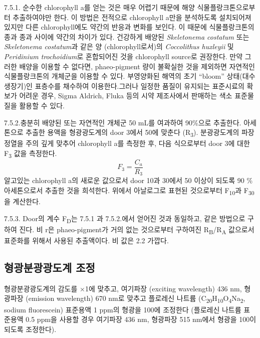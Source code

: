 \documentclass[
]{book}
\begin{document}
7.5.1. 순수한 chlorophyll a를 얻는 것은 매우 어렵기 때문에 해양 식물플랑크톤으로부터 추출하여야만 한다. 이 방법은 전적으로 chlorophyll a만을 분석하도록 설치되어져 있지만 다른 chlorophyll에도 약간의 반응과 변화를 보인다. 이 때문에 식물플랑크톤의 종과 종과 사이에 약간의 차이가 있다. 건강하게 배양된 \emph{Skeletonema costatum} 또는 \emph{Skeletonema costatum}과 같은 양 (chlorophyll로서)의 \emph{Coccolithus huxleyii} 및 \emph{Peridinium trochoidium}로 혼합되어진 것을 chlorophyll source로 권장한다. 만약 그러한 배양을 이용할 수 없다면, phaeo-pigment 량이 불확실한 것을 제외하면 자연적인 식물플랑크톤의 개체군을 이용할 수 있다. 부영양화된 해역의 초기 ``bloom'' 상태(대수 생장기)인 표층수를 채수하여 이용한다.그러나 일정한 품질이 유지되는 표준시료의 확보가 어려운 경우, Sigma Aldrich, Fluka 등의 시약 제조사에서 판매하는 색소 표준물질을 활용할 수 있다.

7.5.2.충분히 배양된 또는 자연적인 개체군 50 mL를 여과하여 90\%으로 추출한다. 아세톤으로 추출한 용액을 형광광도계의 door 3에서 50에 맞춘다 (R\textsubscript{3}). 분광광도계의 파장 정열을 주의 깊게 맞추어 chlorophyll a를 측정한 후, 다음 식으로부터 door 3에 대한 F\textsubscript{3} 값을 측정한다.\\
\[F_3=\frac{C_a}{R_3}\]
알고있는 chlorophyll a의 새로운 값으로서 door 10과 30에서 50 이상이 되도록 90 \% 아세톤으로서 추출한 것을 희석한다. 위에서 아날로그로 표현된 것으로부터 F\textsubscript{10}과 F\textsubscript{30}을 계산한다.

7.5.3. Door의 계수 F\textsubscript{D}는 7.5.1 과 7.5.2.에서 얻어진 것과 동일하고, 같은 방법으로 구하여 진다. 비 r은 phaeo-pigment가 거의 없는 것으로부터 구하여진 R\textsubscript{B}/R\textsubscript{A} 값으로서 표준화를 위해서 사용된 추출액이다. 비 값은 2.2 가깝다.

\hypertarget{uxd615uxad11uxbd84uxad11uxad11uxb3c4uxacc4-uxc870uxc815}{%
\subsection{형광분광광도계 조정}\label{uxd615uxad11uxbd84uxad11uxad11uxb3c4uxacc4-uxc870uxc815}}

형광분광광도계의 감도를 ×1에 맞추고, 여기파장 (exciting wavelength) 436 nm, 형광파장 (emission wavelength) 670 nm로 맞추고 플로레신 나트륨 (C\textsubscript{20}H\textsubscript{10}O\textsubscript{4}Na\textsubscript{2}, sodium fluorescein) 표준용액 1 ppm의 형광을 100에 조정한다 (플로레신 나트륨 표준용액 0.5 ppm을 사용할 경우 여기파장 436 nm, 형광파장 515 nm에서 형광을 100이 되도록 조정한다).
\end{document}
